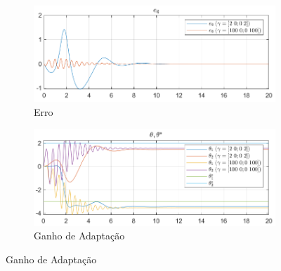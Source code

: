 \documentclass[10pt]{article}
\begin{document}
\begin{figure}[h!]
    \centering
    \begin{subfigure}[b]{0.45\textwidth}
        \centering
        \includegraphics[width=\textwidth]{img/fig07a.png}
        \caption{Erro}
    \end{subfigure}
    \begin{subfigure}[b]{0.45\textwidth}
        \centering
        \includegraphics[width=\textwidth]{img/fig07b.png}
        \caption{Ganho de Adaptação}
    \end{subfigure}

    \vspace{0.5cm}


\end{figure}
\end{document}
